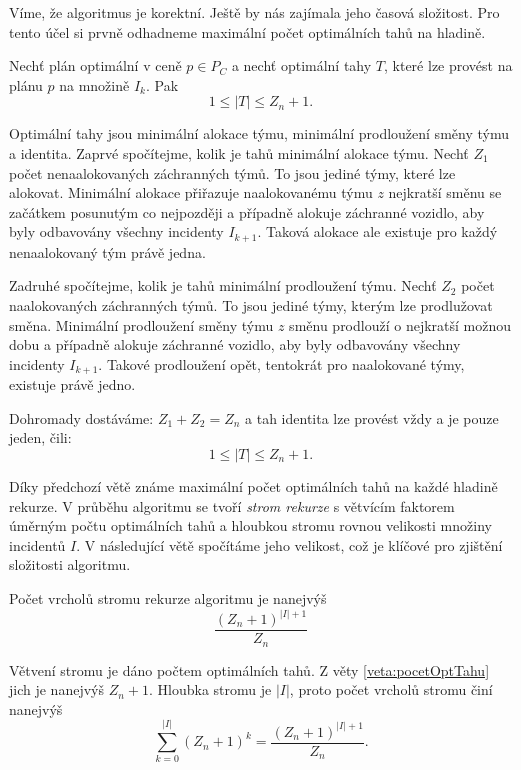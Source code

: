 Víme, že algoritmus je korektní. Ještě by nás zajímala jeho časová složitost.
Pro tento účel si prvně odhadneme maximální počet optimálních tahů na hladině.
\begin{veta}\label{veta:pocetOptTahu}
  Nechť plán optimální v ceně $p \in P_C$ a nechť optimální tahy $T$, které lze provést na plánu $p$ na množině $I_k$.
  Pak
  \begin{equation*}
    1 \leq |T| \leq Z_n + 1.
  \end{equation*}
\end{veta}
\begin{dukaz}
  Optimální tahy jsou minimální alokace týmu, minimální prodloužení směny týmu a identita.
  Zaprvé spočítejme, kolik je tahů minimální alokace týmu.
  Nechť $Z_1$ počet nenaalokovaných záchranných týmů.
  To jsou jediné týmy, které lze alokovat.
  Minimální alokace přiřazuje naalokovanému týmu $z$ nejkratší směnu se začátkem posunutým co nejpozději a případně alokuje záchranné vozidlo,
  aby byly odbavovány všechny incidenty $I_{k+1}$.
  Taková alokace ale existuje pro každý nenaalokovaný tým právě jedna.

  Zadruhé spočítejme, kolik je tahů minimální prodloužení týmu.
  Nechť $Z_2$ počet naalokovaných záchranných týmů.
  To jsou jediné týmy, kterým lze prodlužovat směna.
  Minimální prodloužení směny týmu $z$ směnu prodlouží o nejkratší možnou dobu a případně alokuje záchranné vozidlo,
  aby byly odbavovány všechny incidenty $I_{k+1}$.
  Takové prodloužení opět, tentokrát pro naalokované týmy, existuje právě jedno.

  Dohromady dostáváme: $Z_1 + Z_2 = Z_n$ a tah identita lze provést vždy a je pouze jeden, čili:
  \begin{equation*}
    1 \leq |T| \leq Z_n + 1.
  \end{equation*}
\end{dukaz}

Díky předchozí větě známe maximální počet optimálních tahů na každé hladině rekurze. V průběhu algoritmu
se tvoří \textit{strom rekurze} s větvícím faktorem úměrným počtu optimálních tahů a hloubkou stromu rovnou velikosti množiny incidentů $I$.
V následující větě spočítáme jeho velikost, což je klíčové pro zjištění složitosti algoritmu.
\begin{veta}\label{veta:velikostStromuR}
Počet vrcholů stromu rekurze algoritmu je nanejvýš
  \begin{equation*}
    \frac{(Z_n + 1)^{|I| + 1}}{Z_n}
  \end{equation*}
\end{veta}
\begin{dukaz}
  Větvení stromu je dáno počtem optimálních tahů.
  Z věty \ref{veta:pocetOptTahu} jich je nanejvýš $Z_n + 1$.
  Hloubka stromu je $|I|$, proto
  počet vrcholů stromu činí nanejvýš
  \begin{equation*}
    \sum_{k=0}^{|I|} (Z_n + 1)^{k} = \frac{(Z_n + 1)^{|I| + 1}}{Z_n}.
  \end{equation*}
\end{dukaz}


